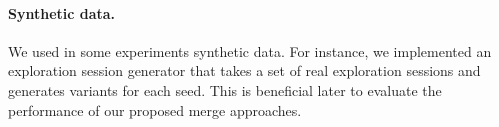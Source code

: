 \paragraph*{ \textbf{Synthetic data.}}
We used in some experiments synthetic data. For instance, we implemented an exploration session generator that takes a set of real exploration sessions and generates variants for each seed. This is beneficial later to evaluate the performance of our proposed merge approaches.



